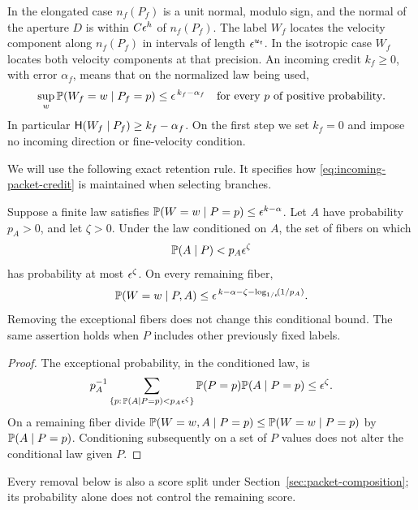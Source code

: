 In the elongated case \(n_f(P_f)\) is a unit normal, modulo sign, and
the normal of the aperture \(D\) is within \(C\epsilon^h\) of \(n_f(P_f)\).
The label \(W_f\) locates the velocity component along \(n_f(P_f)\)
in intervals of length \(\epsilon^{u_t}\).  In the isotropic case \(W_f\)
locates both velocity components at that precision.  An incoming
credit \(k_f\geq0\), with error \(\alpha_f\), means that on the
normalized law being used,
\begin{equation}
 \sup_w\mathbb P(W_f=w\mid P_f=p)\leq
       \epsilon^{\,k_f-\alpha_f}
       \quad\text{for every \(p\) of positive probability}.
 \label{eq:incoming-packet-credit}
\end{equation}
In particular \(\mathsf H(W_f\mid P_f)\geq k_f-\alpha_f\).
On the first step we set \(k_f=0\) and impose no incoming direction
or fine-velocity condition.

We will use the following exact retention rule.  It specifies how
\eqref{eq:incoming-packet-credit} is maintained when selecting branches.

\begin{lemma}
\label{lem:packet-credit-retention}
Suppose a finite law satisfies
\(\mathbb P(W=w\mid P=p)\leq\epsilon^{k-\alpha}\).
Let \(A\) have probability \(p_A>0\), and let \(\zeta>0\).
Under the law conditioned on \(A\), the set of fibers on which
\[
 \mathbb P(A\mid P)<p_A\epsilon^\zeta
\]
has probability at most \(\epsilon^\zeta\).  On every remaining fiber,
\begin{equation}
 \mathbb P(W=w\mid P,A)\leq
   \epsilon^{\,k-\alpha-\zeta-\log_{1/\epsilon}\!\left(1/p_A\right)}.
 \label{eq:credit-retention}
\end{equation}
Removing the exceptional fibers does not change this conditional
bound.  The same assertion holds when \(P\) includes other previously
fixed labels.
\end{lemma}

\begin{proof}
The exceptional probability, in the conditioned law, is
\[
 p_A^{-1}\sum_{\{p:\,\mathbb P(A\mid P=p)<p_A\epsilon^\zeta\}}
       \mathbb P(P=p)\mathbb P(A\mid P=p)\leq\epsilon^\zeta.
\]
On a remaining fiber divide
\(\mathbb P(W=w,A\mid P=p)\leq\mathbb P(W=w\mid P=p)\)
by \(\mathbb P(A\mid P=p)\).  Conditioning subsequently on a set of \(P\)
values does not alter the conditional law given \(P\).
\end{proof}

Every removal below is also a score split under
Section~\ref{sec:packet-composition}; its probability alone does
not control the remaining score.


